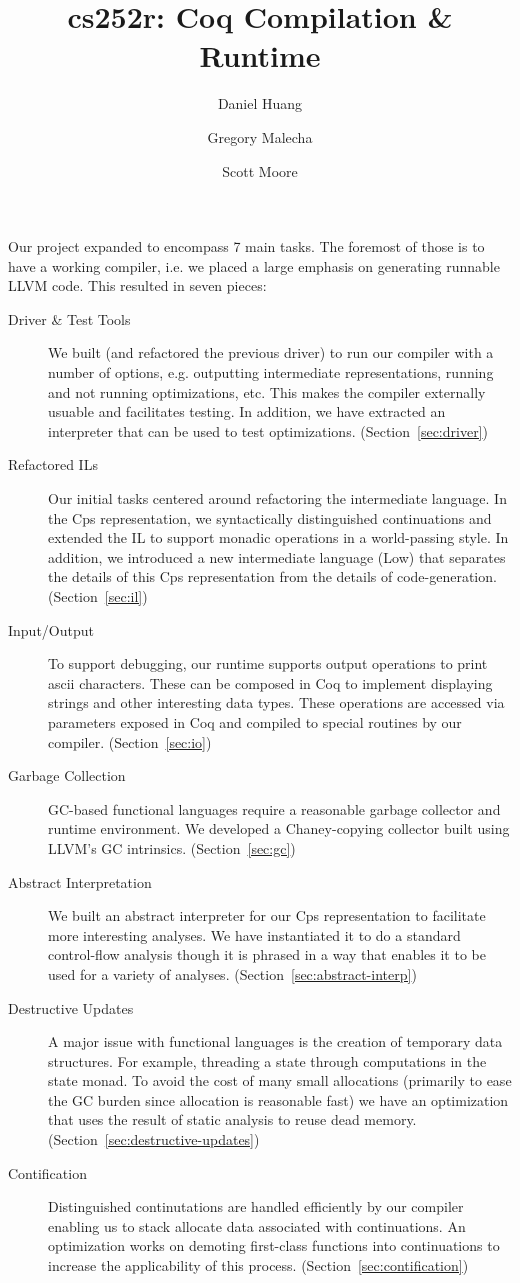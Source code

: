 \documentclass{article}
\title{cs252r: Coq Compilation \& Runtime}
\author{Daniel Huang \and Gregory Malecha \and Scott Moore}
\begin{document}
\maketitle

Our project expanded to encompass 7 main tasks. The foremost of those is to have a working compiler, i.e. we placed a large emphasis on generating runnable LLVM code. This resulted in seven pieces:

\begin{description}
\item[Driver \& Test Tools]
We built (and refactored the previous driver) to run our compiler with a number of options, e.g. outputting intermediate representations, running and not running optimizations, etc. This makes the compiler externally usuable and facilitates testing. In addition, we have extracted an interpreter that can be used to test optimizations. (Section~\ref{sec:driver})
\item[Refactored ILs]
Our initial tasks centered around refactoring the intermediate language. In the Cps representation, we syntactically distinguished continuations and extended the IL to support monadic operations in a world-passing style. In addition, we introduced a new intermediate language (Low) that separates the details of this Cps representation from the details of code-generation. (Section~\ref{sec:il})
\item[Input/Output]
To support debugging, our runtime supports output operations to print ascii characters. These can be composed in Coq to implement displaying strings and other interesting data types. These operations are accessed via parameters exposed in Coq and compiled to special routines by our compiler. (Section~\ref{sec:io})
\item[Garbage Collection]
GC-based functional languages require a reasonable garbage collector and runtime environment. We developed a Chaney-copying collector built using LLVM's GC intrinsics. (Section~\ref{sec:gc})
\item[Abstract Interpretation] 
We built an abstract interpreter for our Cps representation to facilitate more interesting analyses. We have instantiated it to do a standard control-flow analysis though it is phrased in a way that enables it to be used for a variety of analyses. (Section~\ref{sec:abstract-interp})
\item[Destructive Updates]
A major issue with functional languages is the creation of temporary data structures. For example, threading a state through computations in the state monad. To avoid the cost of many small allocations (primarily to ease the GC burden since allocation is reasonable fast) we have an optimization that uses the result of static analysis to reuse dead memory. (Section~\ref{sec:destructive-updates})
\item[Contification]
Distinguished continutations are handled efficiently by our compiler enabling us to stack allocate data associated with continuations. An optimization works on demoting first-class functions into continuations to increase the applicability of this process. (Section~\ref{sec:contification})
\end{description}
\end{document}
